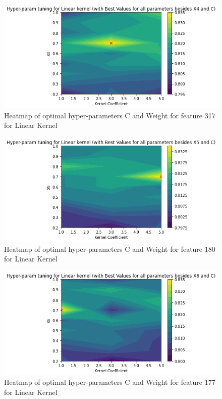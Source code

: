 \begin{figure}[h!]
    \centering
    \includegraphics[width=\textwidth]{figures/final/linear_x4.png}
    \caption{\label{fig:lin_317} Heatmap of optimal hyper-parameters C and Weight for feature 317 for Linear Kernel}
\end{figure}
\begin{figure}[h!]
    \centering
    \includegraphics[width=\textwidth]{figures/final/linear_x5.png}
    \caption{\label{fig:lin_180} Heatmap of optimal hyper-parameters C and Weight for feature 180 for Linear Kernel}
\end{figure}
\begin{figure}[h!]
    \centering
    \includegraphics[width=\textwidth]{figures/final/linear_x6.png}
    \caption{\label{fig:lin_177} Heatmap of optimal hyper-parameters C and Weight for feature 177 for Linear Kernel}
\end{figure}
\newpage

